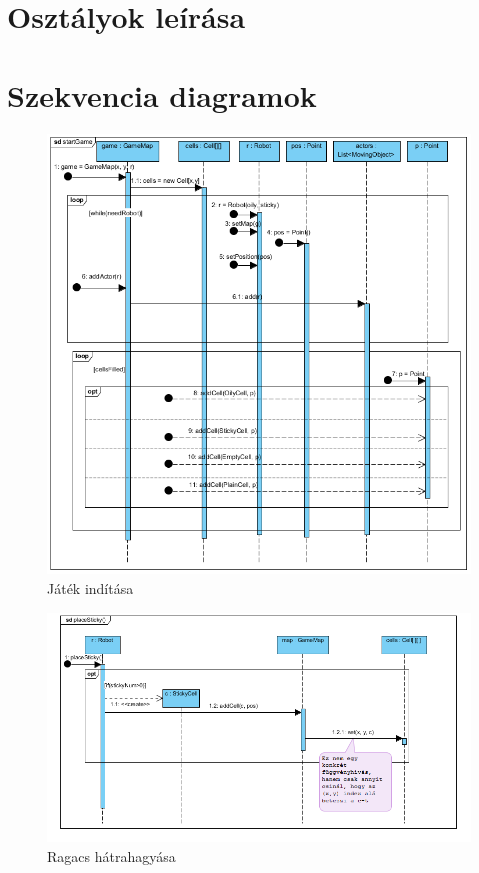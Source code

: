 \section{Osztályok leírása}


\clearpage
\section{Szekvencia diagramok}


\begin{figure}[!htbp]
	\begin{center}
		\includegraphics[width=166mm, center]{./chapters/chapter04/GameMap.png}
		\caption{Játék indítása}
	\end{center}
\end{figure}



\begin{figure}[!htbp]
	\begin{center}
		\includegraphics[width=166mm, center]{./chapters/chapter04/sticky.png}
		\caption{Ragacs hátrahagyása}
	\end{center}
\end{figure}

